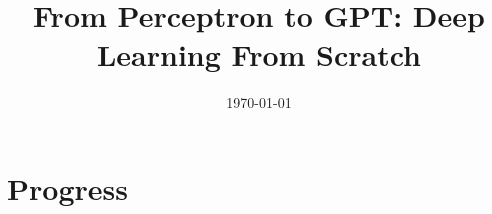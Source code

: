 \documentclass[11pt]{article}
\title{From Perceptron to GPT: Deep Learning From Scratch}
\author{}
\date{\today}
\begin{document}
\maketitle
\section*{Progress}
\progressdashboard
\tableofcontents














\end{document}
